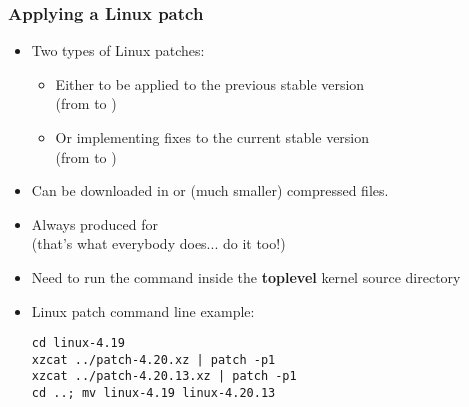 \begin{frame}[fragile]
  \frametitle{Applying a Linux patch}
  \begin{itemize}
  \item Two types of Linux patches:
        \begin{itemize}
	\item Either to be applied to the previous stable version\\
	      (from  to )
	\item Or implementing fixes to the current stable version\\
	      (from  to )
	\end{itemize}
  \item Can be downloaded in  or  (much
    smaller) compressed files.
  \item Always produced for \\
    (that's what everybody does... do it too!)
  \item Need to run the  command inside the {\bf toplevel}
    kernel source directory
  \item Linux patch command line example:\\
\begin{verbatim}
cd linux-4.19
xzcat ../patch-4.20.xz | patch -p1
xzcat ../patch-4.20.13.xz | patch -p1
cd ..; mv linux-4.19 linux-4.20.13
\end{verbatim}
  \end{itemize}
\end{frame}

